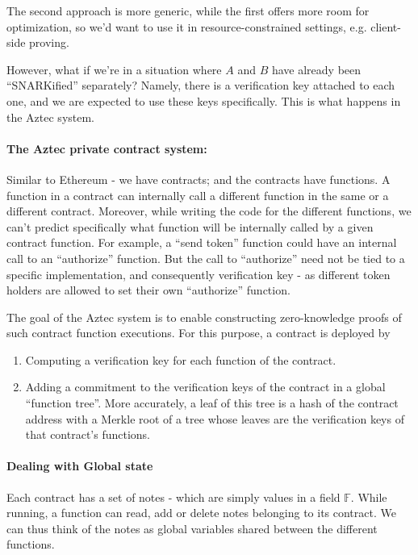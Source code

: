 \documentclass[11pt]{article} %
\newcommand{\F}{\ensuremath{\mathbb F}\xspace}
\begin{document}
The second approach is more generic, while the first offers more room for optimization, so we'd want to use it in resource-constrained settings, e.g. client-side proving.


However, what if we're in a situation where $A$ and $B$ have already been ``SNARKified'' separately?
Namely, there is a verification key attached to each one, and we are expected to use these keys specifically.
This is what happens in the Aztec system.
\paragraph{The Aztec private contract system:}
 Similar to Ethereum - we have contracts; and the contracts have functions.
A function in a contract can internally call a different function in the same or a different contract. Moreover, while writing the code for the different functions,
we can't predict specifically what function will be internally called by a given contract function. For example, a ``send token'' function could have an internal call to an ``authorize'' function.
But the call to ``authorize'' need not be tied to a specific implementation, and consequently verification key - as different token holders are allowed to set their own ``authorize'' function.


The goal of the Aztec system is to enable constructing zero-knowledge proofs of such contract function executions.
For this purpose, a contract is deployed by 
\begin{enumerate}
\item  Computing a verification key for each function of the contract.
\item Adding a commitment to the verification keys of the contract in a global ``function tree''. More accurately, a leaf of this tree is a hash of the
contract address with a Merkle root of a tree whose leaves are the verification keys of that contract's functions.

\end{enumerate}

\paragraph{Dealing with Global state}
Each contract has a set of notes - which are simply  values in a field \F. 
While running, a function can read, add or delete notes belonging to its contract.
We can thus think of the notes as global variables shared between the different functions.
\end{document}

